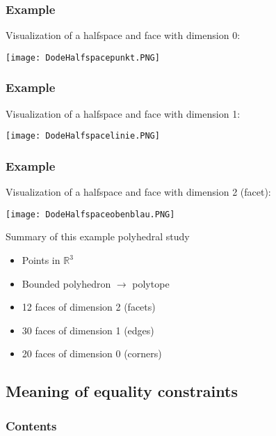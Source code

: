 \documentclass[xcolor=dvipsnames]{beamer}
\numberwithin{bsp}{section}
\numberwithin{figure}{section}
\begin{document}
\begin{frame}
	\frametitle{Example}
	Visualization of a halfspace and face with dimension 0:
	\begin{center}
		\texttt{[image: DodeHalfspacepunkt.PNG]}
	\end{center} 
\end{frame}

\begin{frame}
	\frametitle{Example}
	Visualization of a halfspace and face with dimension 1:
	\begin{center}
		\texttt{[image: DodeHalfspacelinie.PNG]}
	\end{center} 
\end{frame}

\begin{frame}
	\frametitle{Example}
	Visualization of a halfspace and face with dimension 2 (facet):
	\begin{center}
		\texttt{[image: DodeHalfspaceobenblau.PNG]}
	\end{center} 
\end{frame}

\begin{frame}
	\begin{block}{Summary of this example polyhedral study}
		\begin{itemize}
			\item Points in $\mathbb{R}^{3}$
			\item Bounded polyhedron $\rightarrow$ polytope
			\item 12 faces of dimension 2 (facets)
			\item 30 faces of dimension 1 (edges)
			\item 20 faces of dimension 0 (corners)
		\end{itemize}
	\end{block}
\end{frame}

\subsection{Meaning of equality constraints}

\begin{frame}[plain]
	\frametitle{Contents}
	\linespread{1.1}
	\tableofcontents[currentsubsection]
\end{frame}
\end{document}
